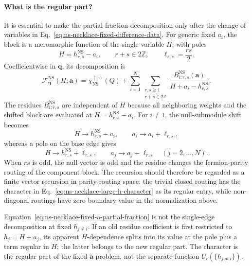 \documentclass[11pt]{article}
\newcommand{\NS}{\mathrm{NS}}
\newcommand{\F}{\mathcal F}
\begin{document}
\paragraph{What is the regular part?}
It is essential to make the partial-fraction decomposition only after the
change of variables in
Eq.~\eqref{eq:ns-necklace-fixed-difference-data}.  For generic fixed
\(a_i\), the block is a meromorphic function of the single variable \(H\),
with poles
\begin{equation}
 H=h^{\NS}_{r,s}-a_i,\qquad
 r+s\in2\mathbb Z,\qquad
 \ell_{r,s}=\frac{rs}{2}.
\end{equation}
Coefficientwise in \(\boldsymbol q\), its decomposition is
\begin{equation}
 \F^{\NS}_{\boldsymbol\eta}(H;\boldsymbol a)
 =
 \chi^{(\varepsilon)}_{\NS}(Q)
 +
 \sum_{i=1}^{N}
 \sum_{\substack{r,s\geq1\\r+s\in2\mathbb Z}}
 \frac{B^{\NS}_{i;r,s}(\boldsymbol a)}
 {H+a_i-h^{\NS}_{r,s}}.
 \label{eq:ns-necklace-fixed-a-partial-fraction}
\end{equation}
The residues \(B^{\NS}_{i;r,s}\) are independent of \(H\) because all
neighboring weights and the shifted block are evaluated at
\(H=h^{\NS}_{r,s}-a_i\).  For \(i\neq1\), the null-submodule shift becomes
\begin{equation}
 H\longrightarrow h^{\NS}_{r,s}-a_i,\qquad
 a_i\longrightarrow a_i+\ell_{r,s},
 \label{eq:ns-necklace-shift-nonbase-edge}
\end{equation}
whereas a pole on the base edge gives
\begin{equation}
 H\longrightarrow h^{\NS}_{r,s}+\ell_{r,s},\qquad
 a_j\longrightarrow a_j-\ell_{r,s}\quad(j=2,\ldots,N).
 \label{eq:ns-necklace-shift-base-edge}
\end{equation}
When \(rs\) is odd, the null vector is odd and the residue changes the
fermion-parity routing of the component block.  The recursion should
therefore be regarded as a finite vector recursion in parity-routing space:
the trivial closed routing has the character in
Eq.~\eqref{eq:ns-necklace-large-h-character} as its regular entry, while
non-diagonal routings have zero boundary value in the normalization above.

Equation~\eqref{eq:ns-necklace-fixed-a-partial-fraction} is not the
single-edge decomposition at fixed \(h_{j\neq i}\).  If an old residue
coefficient is first restricted to \(h_j=H+a_j\), its apparent
\(H\)-dependence splits into its value at the pole plus a term regular in
\(H\); the latter belongs to the new regular part.  The character is the
regular part of the fixed-\(\boldsymbol a\) problem, not the separate
function \(U_i(\{h_{j\neq i}\})\).
\end{document}
